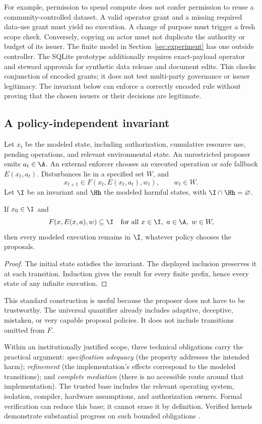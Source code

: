 For example, permission to spend compute does not confer permission to reuse a community-controlled dataset. A valid operator grant and a missing required data-use grant must yield no execution. A change of purpose must trigger a fresh scope check. Conversely, copying an actor must not duplicate the authority or budget of its issuer. The finite model in Section~\ref{sec:experiment} has one outside controller. The SQLite prototype additionally requires exact-payload operator and steward approvals for synthetic data release and document edits. This checks conjunction of encoded grants; it does not test multi-party governance or issuer legitimacy. The invariant below can enforce a correctly encoded rule without proving that the chosen issuers or their decisions are legitimate.

\subsection{A policy-independent invariant}
Let $x_t$ be the modeled state, including authorization, cumulative resource use, pending operations, and relevant environmental state. An unrestricted proposer emits $a_t\in\A$. An external enforcer chooses an executed operation or safe fallback $E(x_t,a_t)$. Disturbances lie in a specified set $W$, and
\[
x_{t+1}\in F(x_t,E(x_t,a_t),w_t),\qquad w_t\in W.
\]
Let $\I$ be an invariant and $\Hh$ the modeled harmful states, with $\I\cap\Hh=\varnothing$.

\begin{lemma}
\label{lem:invariant}
If $x_0\in\I$ and
\[
F(x,E(x,a),w)\subseteq\I
\quad\text{for all }x\in\I,\ a\in\A,\ w\in W,
\]
then every modeled execution remains in $\I$, whatever policy chooses the proposals.
\end{lemma}
\begin{proof}
The initial state satisfies the invariant. The displayed inclusion preserves it at each transition. Induction gives the result for every finite prefix, hence every state of any infinite execution.
\end{proof}

This standard construction is useful because the proposer does not have to be trustworthy. The universal quantifier already includes adaptive, deceptive, mistaken, or very capable proposal policies. It does not include transitions omitted from $F$.

 Within an institutionally justified scope, three technical obligations carry the practical argument: \emph{specification adequacy} (the property addresses the intended harm); \emph{refinement} (the implementation's effects correspond to the modeled transitions); and \emph{complete mediation} (there is no accessible route around that implementation). The trusted base includes the relevant operating system, isolation, compiler, hardware assumptions, and authorization owners. Formal verification can reduce this base; it cannot erase it by definition. Verified kernels demonstrate substantial progress on such bounded obligations \cite{sel4}.

